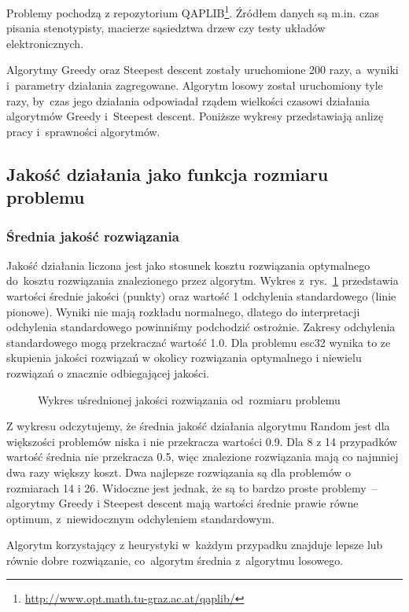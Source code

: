 \documentclass[a4paper,10pt]{article}
\begin{document}
Problemy pochodzą z repozytorium QAPLIB\footnote{\url{http://www.opt.math.tu-graz.ac.at/qaplib/}}.
Źródłem danych są m.in. czas pisania stenotypisty, macierze sąsiedztwa drzew czy testy układów elektronicznych.

Algorytmy Greedy oraz Steepest descent zostały uruchomione 200 razy, a~wyniki i~parametry działania zagregowane. 
Algorytm losowy został uruchomiony tyle razy, by~czas jego działania odpowiadał rządem wielkości czasowi działania algorytmów Greedy
i~Steepest descent.
Poniższe wykresy przedstawiają anlizę pracy i~sprawności algorytmów.
\subsection{Jakość działania jako funkcja rozmiaru problemu}
\subsubsection{Średnia jakość rozwiązania}
Jakość działania liczona jest jako stosunek kosztu rozwiązania optymalnego do~kosztu rozwiązania znalezionego przez
algorytm.
Wykres z~rys.~\ref{fig:qualityvssizemean} przedstawia wartości średnie jakości (punkty) oraz wartość 1 odchylenia standardowego (linie pionowe).
Wyniki nie mają rozkładu normalnego, dlatego do interpretacji odchylenia standardowego powinniśmy podchodzić ostrożnie.
Zakresy odchylenia standardowego mogą przekraczać wartość \num{1.0}.
Dla problemu esc32 wynika to ze skupienia jakości rozwiązań w okolicy rozwiązania optymalnego i niewielu rozwiązań o znacznie odbiegającej jakości.
\begin{figure}[!htpb]
\begin{center}

\caption{Wykres uśrednionej jakości rozwiązania od~rozmiaru problemu}
\label{fig:qualityvssizemean}
\end{center}
\end{figure}

Z wykresu odczytujemy, że średnia jakość działania algorytmu Random jest dla większości problemów niska i nie przekracza wartości \num{0.9}.  
Dla 8 z 14 przypadków wartość średnia nie przekracza \num{0.5}, więc znalezione rozwiązania mają co najmniej dwa razy większy koszt.
Dwa najlepsze rozwiązania są dla problemów o rozmiarach 14 i 26.
Widoczne jest jednak, że są to bardzo proste problemy~-- algorytmy Greedy i Steepest descent mają wartości średnie prawie równe optimum,
z~niewidocznym odchyleniem standardowym.

Algorytm korzystający z heurystyki w~każdym przypadku znajduje lepsze lub równie dobre rozwiązanie, co~algorytm średnia z~algorytmu losowego.
\end{document}

